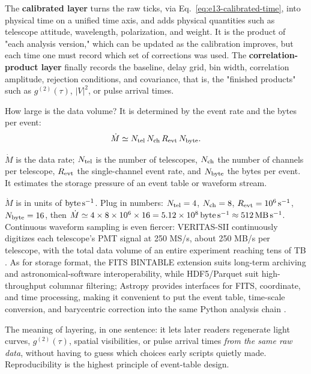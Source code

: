 The \textbf{calibrated layer} turns the raw ticks, via Eq.~\eqref{eq:e13-calibrated-time}, into physical time on a unified time axis, and adds physical quantities such as telescope attitude, wavelength, polarization, and weight. It is the product of "each analysis version," which can be updated as the calibration improves, but each time one must record which set of corrections was used. The \textbf{correlation-product layer} finally records the baseline, delay grid, bin width, correlation amplitude, rejection conditions, and covariance, that is, the "finished products" such as $g^{(2)}(\tau)$, $|V|^2$, or pulse arrival times.

How large is the data volume? It is determined by the event rate and the bytes per event:
\begin{equation}
  \dot{M}
  \simeq
  N_{\rm tel}\,N_{\rm ch}\,R_{\rm evt}\,N_{\rm byte}.
  \label{eq:e13-data-rate}
\end{equation}
\begin{formulaexplain}
$\dot M$ is the data rate; $N_{\rm tel}$ is the number of telescopes, $N_{\rm ch}$ the number of channels per telescope, $R_{\rm evt}$ the single-channel event rate, and $N_{\rm byte}$ the bytes per event. It estimates the storage pressure of an event table or waveform stream.
\end{formulaexplain}
$\dot M$ is in units of ${\rm byte\,s^{-1}}$. Plug in numbers: $N_{\rm tel}=4$, $N_{\rm ch}=8$, $R_{\rm evt}=10^6\,{\rm s^{-1}}$, $N_{\rm byte}=16$, then $\dot M\simeq4\times8\times10^6\times16=5.12\times10^8\,{\rm byte\,s^{-1}}\approx512\,{\rm MB\,s^{-1}}$. Continuous waveform sampling is even fiercer: VERITAS-SII continuously digitizes each telescope's PMT signal at 250 MS/s, about 250 MB/s per telescope, with the total data volume of an entire experiment reaching tens of TB \citep{2020NatAs...4.1164A}. As for storage format, the FITS BINTABLE extension suits long-term archiving and astronomical-software interoperability, while HDF5/Parquet suit high-throughput columnar filtering; Astropy provides interfaces for FITS, coordinate, and time processing, making it convenient to put the event table, time-scale conversion, and barycentric correction into the same Python analysis chain \citep{2010A&A...524A..42P,2013A&A...558A..33A,2018AJ....156..123A}.

The meaning of layering, in one sentence: it lets later readers regenerate light curves, $g^{(2)}(\tau)$, spatial visibilities, or pulse arrival times \emph{from the same raw data}, without having to guess which choices early scripts quietly made. Reproducibility is the highest principle of event-table design.

